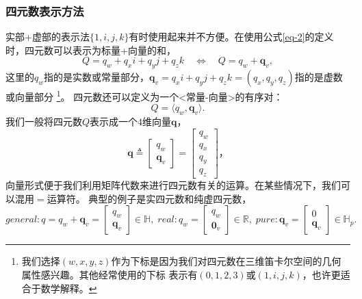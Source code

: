 \documentclass[10pt, a4paper]{article}
\begin{document}
  \subsubsection{四元数表示方法}
  实部+虚部的表示法$\{1, i, j, k\}$有时使用起来并不方便。在使用公式\eqref{eq-2}的定义时，四元数可以表示为标量+向量的和，
  \begin{equation} \label{eq-5}
    Q = q_w + q_xi + q_yj + q_zk \quad \Leftrightarrow \quad Q = q_w + \mathbf{q}_v,
  \end{equation}
  这里的$q_w$指的是实数或常量部分，$\mathbf{q}_v=q_xi + q_yj + q_zk = (q_x, q_y, q_z)$指的是虚数或向量部分
  \footnote{我们选择$(w, x, y, z)$作为下标是因为我们对四元数在三维笛卡尔空间的几何属性感兴趣。其他经常使用的下标
  表示有$(0, 1, 2, 3)$或$(1, i, j, k)$，也许更适合于数学解释。}。
  四元数还可以定义为一个<常量-向量>的有序对：
  \begin{equation} \label{eq-6}
    Q = \langle q_w, \mathbf{q}_v \rangle.
  \end{equation}
  我们一般将四元数$Q$表示成一个$4$维向量$\mathbf{q}$，
  \begin{equation} \label{eq-7}
    \mathbf{q} \triangleq \begin{bmatrix} q_w \\ \mathbf{q}_v \end{bmatrix} =
    \begin{bmatrix} q_w \\ q_x \\ q_y \\ q_z \end{bmatrix}，
  \end{equation}
  向量形式便于我们利用矩阵代数来进行四元数有关的运算。在某些情况下，我们可以混用$=$运算符。
  典型的例子是实四元数和纯虚四元数，
  \begin{equation} \label{eq-8}
    general: q = q_w + \mathbf{q}_v = \begin{bmatrix} q_w \\ \mathbf{q}_v \end{bmatrix} \in \mathbb{H}, \;
    real: q_w = \begin{bmatrix} q_w \\ \mathbf{0}_v \end{bmatrix} \in \mathbb{R}, \;
    pure: \mathbf{q}_v = \begin{bmatrix} 0 \\ \mathbf{q}_v \end{bmatrix} \in \mathbb{H}_p.
  \end{equation}
\end{document}
